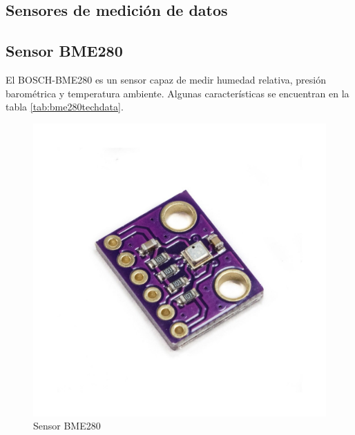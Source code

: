 \documentclass[../main]{subfiles}
\begin{document}
\subsection{Sensores de medición de datos}

\subsection{Sensor BME280}

El BOSCH-BME280 es un sensor capaz de medir humedad relativa, presión
barométrica y temperatura ambiente\cite{boschbme280descr}.
Algunas características se encuentran en la tabla \ref{tab:bme280techdata}.

\begin{figure}[H]
	\centering
	\includegraphics[width=0.5\linewidth]{res/sensor-bme280-presion-temperatura-y-humedad.jpg}
	\caption{Sensor BME280\cite{bme280image}}
	\label{fig:bme280fig}
\end{figure}
\end{document}
